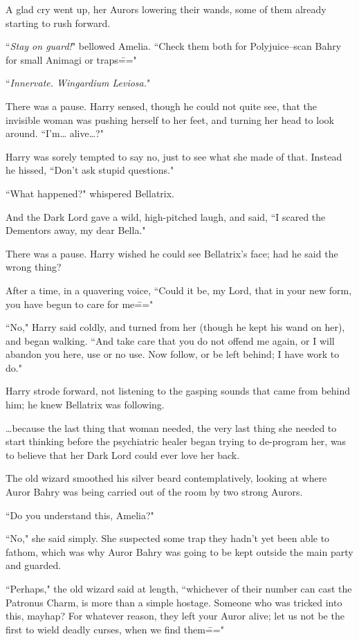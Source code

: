 A glad cry went up, her Aurors lowering their wands, some of them already starting to rush forward.

``\emph{Stay on guard!}" bellowed Amelia. ``Check them both for Polyjuice\---scan Bahry for small Animagi or traps\==="

\later

``\emph{Innervate. Wingardium Leviosa.}"

There was a pause. Harry sensed, though he could not quite see, that the invisible woman was pushing herself to her feet, and turning her head to look around. ``I'm{\ldots} alive{\ldots}?"

Harry was sorely tempted to say no, just to see what she made of that. Instead he hissed, ``Don't ask stupid questions."

``What happened?" whispered Bellatrix.

And the Dark Lord gave a wild, high-pitched laugh, and said, ``I scared the Dementors away, my dear Bella."

There was a pause. Harry wished he could see Bellatrix's face; had he said the wrong thing?

After a time, in a quavering voice, ``Could it be, my Lord, that in your new form, you have begun to care for me\==="

``No," Harry said coldly, and turned from her (though he kept his wand on her), and began walking. ``And take care that you do not offend me again, or I will abandon you here, use or no use. Now follow, or be left behind; I have work to do."

Harry strode forward, not listening to the gasping sounds that came from behind him; he knew Bellatrix was following.

{\ldots}because the last thing that woman needed, the very last thing she needed to start thinking before the psychiatric healer began trying to de-program her, was to believe that her Dark Lord could ever love her back.

\later

The old wizard smoothed his silver beard contemplatively, looking at where Auror Bahry was being carried out of the room by two strong Aurors.

``Do you understand this, Amelia?"

``No," she said simply. She suspected some trap they hadn't yet been able to fathom, which was why Auror Bahry was going to be kept outside the main party and guarded.

``Perhaps," the old wizard said at length, ``whichever of their number can cast the Patronus Charm, is more than a simple hostage. Someone who was tricked into this, mayhap? For whatever reason, they left your Auror alive; let us not be the first to wield deadly curses, when we find them\==="


